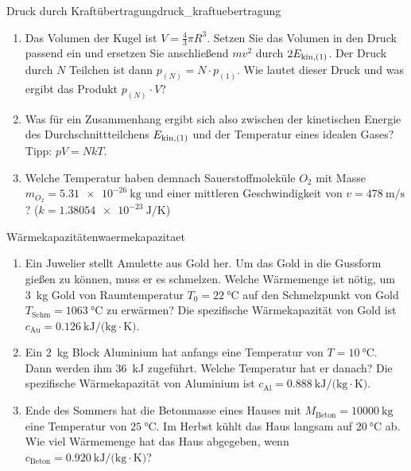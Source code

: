 \documentclass[ngerman]{scrreprt}
\begin{document}
\begin{aufgabebox}{Druck durch Kraftübertragung}{druck_kraftuebertragung}
\begin{enumerate}
    \item Das Volumen der Kugel ist $V=\frac{4}{3}\pi R^{3}$. Setzen Sie das Volumen in den Druck passend ein und ersetzen Sie anschließend $mv^{2}$ durch $2 E_{\mathrm{kin},(1)}$. Der Druck durch $N$ Teilchen ist dann $p_{(N)}=N\cdot p_{(1)}$. Wie lautet dieser Druck und was ergibt das Produkt $p_{(N)}\cdot V$?
    
    \item Was für ein Zusammenhang ergibt sich also zwischen der kinetischen Energie des Durchschnittteilchens $E_{\mathrm{kin},(1)}$ und der Temperatur eines idealen Gases? Tipp: $pV=NkT$.
    
    \item Welche Temperatur haben demnach Sauerstoffmoleküle $O_2$ mit Masse $m_{O_2}=\SI{5.31e-26}{\kilo\gram}$ und einer mittleren Geschwindigkeit von $v=\SI{478}{\meter\per\second}$? ($k=\SI{1.38054e-23}{\joule\per\kelvin}$)
\end{enumerate}
\end{aufgabebox}



\begin{aufgabebox}{Wärmekapazitäten}{waermekapazitaet}
\begin{enumerate}
    \item Ein Juwelier stellt Amulette aus Gold her. Um das Gold in die Gussform gießen zu können, muss er es schmelzen. Welche Wärmemenge ist nötig, um \SI{3}{\kilo\gram} Gold von Raumtemperatur $T_0 = \SI{22}{\celsius}$ auf den Schmelzpunkt von Gold $T_{\text{Schm}} = \SI{1063}{\celsius}$ zu erwärmen? Die spezifische Wärmekapazität von Gold ist $c_{\text{Au}} = \SI{0.126}{\kilo\joule\per(\kilo\gram\cdot\kelvin)}$.
    
    \item Ein \SI{2}{\kilo\gram} Block Aluminium hat anfangs eine Temperatur von $T=\SI{10}{\celsius}$. Dann werden ihm \SI{36}{\kilo\joule} zugeführt. Welche Temperatur hat er danach? Die spezifische Wärmekapazität von Aluminium ist $c_{\text{Al}} = \SI{0.888}{\kilo\joule\per(\kilo\gram\cdot\kelvin)}$.
    
    \item Ende des Sommers hat die Betonmasse eines Hauses mit $M_{\text{Beton}}=\SI{10000}{\kilo\gram}$ eine Temperatur von $\SI{25}{\celsius}$. Im Herbst kühlt das Haus langsam auf $\SI{20}{\celsius}$ ab. Wie viel Wärmemenge hat das Haus abgegeben, wenn $c_{\text{Beton}}=\SI{0.920}{\kilo\joule\per(\kilo\gram\cdot\kelvin)}$?
\end{enumerate}
\end{aufgabebox}
\end{document}
